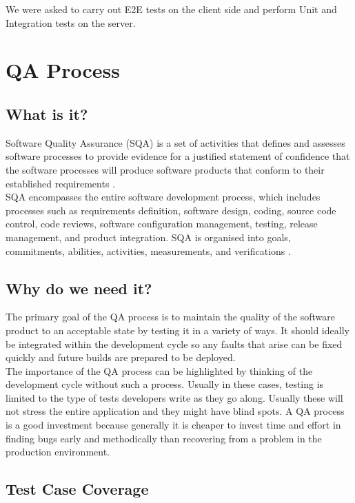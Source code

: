We were asked to carry out E2E tests on the client side and perform Unit and Integration tests on the server.

\section{QA Process}
\label{sec:qa-process}

\subsection{What is it?}
\label{subsec:qa-process-what-is-it}
Software Quality Assurance (SQA) is a set of activities that defines and assesses  software processes to provide evidence for a justified statement of confidence that the software processes will produce software products that conform to their established requirements \cite{qa-standard}.
\\

SQA encompasses the entire software development process, which includes processes such as requirements definition, software design, coding, source code control, code reviews, software configuration management, testing, release management, and product integration. SQA is organised into goals, commitments, abilities, activities, measurements, and verifications \cite{project-quality-management}.

\subsection{Why do we need it?}
\label{subsec:qa-process-why-do-we-need-it}
The primary goal of the QA process is to maintain the quality of the software product to an acceptable state by testing it in a variety of ways. It should ideally be integrated within the development cycle so any faults that arise can be fixed quickly and future builds are prepared to be deployed.
\\

The importance of the QA process can be highlighted by thinking of the development cycle without such a process. Usually in these cases, testing is limited to the type of tests developers write as they go along. Usually these will not stress the entire application and they might have blind spots. A QA process is a good investment because generally it is cheaper to invest time and effort in finding bugs early and methodically than recovering from a problem in the production environment.

\subsection{Test Case Coverage}
\label{subsec:test-case-coverage}

